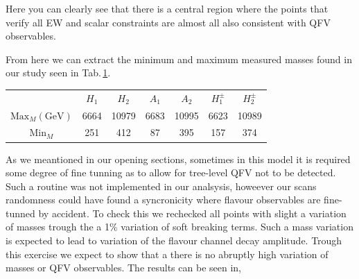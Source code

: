 Here you can clearly see that there is a central region where the points that verify all EW and scalar constraints are almost all also consistent with QFV observables. 

From here we can extract the minimum and maximum measured masses found in our study seen in Tab.\,\ref{Tab:BadTable}.

\begin{table}[H]
\centering
\begin{tabular}{ccccccc}
                            & $H_1$ & $H_2$ & $A_1$ & $A_2$ & $H_1^\pm$ & $H_2^\pm$ \\
$\text{Max}_M (\text{GeV})$ & 6664  & 10979 & 6683  & 10995 & 6623      & 10989     \\
$\text{Min}_M$              & 251   & 412   & 87    & 395   & 157       & 374      
\label{Tab:BadTable}
\end{tabular}
\end{table}

As we meantioned in our opening sections, sometimes in this model it is required some degree of fine tunning as to allow for tree-level QFV not to be detected. 
%
Such a routine was not implemented in our analsysis, howeever our scans randomness could have found a syncronicity where flavour observables are fine-tunned by accident. 
%
%
To check this we rechecked all points with slight a variation of masses trough the a 1\% variation of soft breaking terms. 
%
Such a mass variation is expected to lead to variation of the flavour channel decay amplitude. 
%
Trough this exercise we expect to show that a there is no abruptly high variation of masses or QFV observables.
% 
The results can be seen in, 

